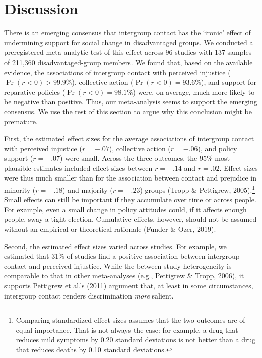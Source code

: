 \documentclass[12pt, letterpaper]{article}
\begin{document}
\hypertarget{discussion}{%
\section{Discussion}\label{discussion}}

There is an emerging consensus that intergroup contact has the `ironic'
effect of undermining support for social change in disadvantaged groups.
We conducted a preregistered meta-analytic test of this effect across 96
studies with 137 samples of 211,360 disadvantaged-group members. We
found that, based on the available evidence, the associations of
intergroup contact with perceived injustice (\(\Pr (r < 0) > 99.9\%\)),
collective action (\(\Pr (r < 0) = 93.6\%\)), and support for reparative
policies (\(\Pr (r < 0) = 98.1\%\)) were, on average, much more likely
to be negative than positive. Thus, our meta-analysis seems to support
the emerging consensus. We use the rest of this section to argue why
this conclusion might be premature.

First, the estimated effect sizes for the average associations of
intergroup contact with perceived injustice (\(r = -.07\)), collective
action (\(r = -.06\)), and policy support (\(r = -.07\)) were small.
Across the three outcomes, the 95\% most plausible estimates included
effect sizes between \(r = -.14\) and \(r = .02\). Effect sizes were
thus much smaller than for the association between contact and prejudice
in minority (\(r = -.18\)) and majority (\(r = -.23\)) groups (Tropp \&
Pettigrew, 2005).\footnote{Comparing standardized effect sizes assumes
  that the two outcomes are of equal importance. That is not always the
  case: for example, a drug that reduces mild symptoms by 0.20 standard
  deviations is not better than a drug that reduces deaths by 0.10
  standard deviations.} Small effects can still be important if they
accumulate over time or across people. For example, even a small change
in policy attitudes could, if it affects enough people, sway a tight
election. Cumulative effects, however, should not be assumed without an
empirical or theoretical rationale (Funder \& Ozer, 2019).

Second, the estimated effect sizes varied across studies. For example,
we estimated that 31\% of studies find a positive association between
intergroup contact and perceived injustice. While the between-study
heterogeneity is comparable to that in other meta-analyses (e.g.,
Pettigrew \& Tropp, 2006), it supports Pettigrew et al.'s (2011)
argument that, at least in some circumstances, intergroup contact
renders discrimination \emph{more} salient.
\end{document}
